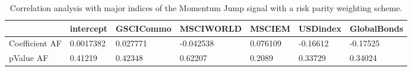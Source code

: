 \begin{table}[H]
\centering
\begin{tabular}{lllllll}
& intercept & GSCICommo & MSCIWORLD & MSCIEM & USDindex & GlobalBonds \\ 
\hline 
Coefficient AF & 0.0017382 & 0.027771 & -0.042538 & 0.076109 & -0.16612 & -0.17525 \\ 
pValue AF & 0.41219 & 0.42348 & 0.62207 & 0.2089 & 0.33729 & 0.34024 \\ 
\hline
\end{tabular}
\caption{Correlation analysis with major indices of the Momentum Jump signal with a risk parity weighting scheme.}
\label{MOMJUMPRP_AFACTOR}
\end{table}